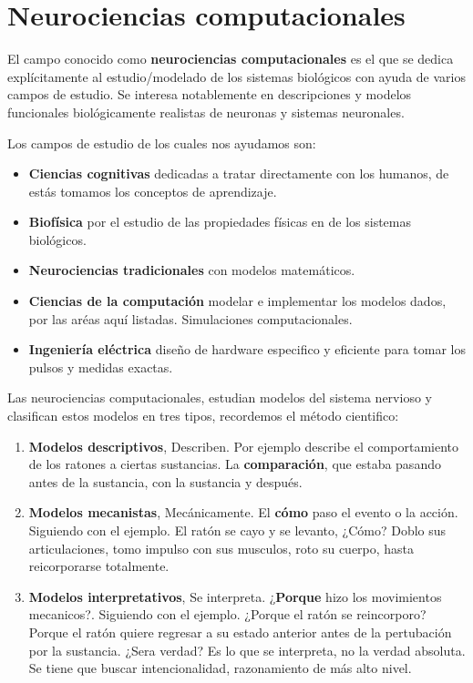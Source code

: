 \section{Neurociencias computacionales}

El campo conocido como \textbf{neurociencias computacionales}\cite{sonNC} es el que se dedica explícitamente al estudio/modelado de los sistemas biológicos con ayuda de varios campos de estudio. Se interesa notablemente en descripciones y modelos funcionales biológicamente realistas de neuronas y sistemas neuronales. 

Los campos de estudio de los cuales nos ayudamos son:
\begin{itemize}
 \item  \textbf{Ciencias cognitivas} dedicadas a tratar directamente con los humanos, de estás tomamos los conceptos de aprendizaje.
 \item  \textbf{Biofísica}  por el estudio de las propiedades físicas en de los sistemas biológicos. 
 \item  \textbf{Neurociencias tradicionales} con modelos matemáticos. 
 
 \item  \textbf{Ciencias de la computación} modelar e implementar los modelos dados, por las aréas aquí listadas. Simulaciones computacionales. 
 
 \item  \textbf{Ingeniería eléctrica} diseño de hardware especifico y eficiente para tomar los pulsos y medidas exactas.  
 
\end{itemize}

Las neurociencias computacionales, estudian modelos del sistema nervioso y clasifican estos modelos en tres tipos, recordemos el método cientifico: 

\begin{enumerate}
 \item \textbf{Modelos descriptivos}, Describen. Por ejemplo describe el comportamiento de los ratones a ciertas sustancias. La \textbf{comparación}, que estaba pasando antes de la sustancia, con la sustancia y después. 
  
 \item \textbf{Modelos mecanistas}, Mecánicamente. El \textbf{cómo} paso el evento o la acción. Siguiendo con el ejemplo. El ratón se cayo y se levanto, ¿Cómo? Doblo sus articulaciones, tomo impulso con sus musculos, roto su cuerpo, hasta reicorporarse totalmente.
 
 \item \textbf{Modelos interpretativos}, Se interpreta. ¿\textbf{Porque} hizo los movimientos mecanicos?. Siguiendo con el ejemplo. ¿Porque el ratón se reincorporo? Porque el ratón quiere regresar a su estado anterior antes de la pertubación por la sustancia. ¿Sera verdad? Es lo que se interpreta, no la verdad absoluta. Se tiene que buscar intencionalidad, razonamiento de más alto nivel.
 
\end{enumerate}

